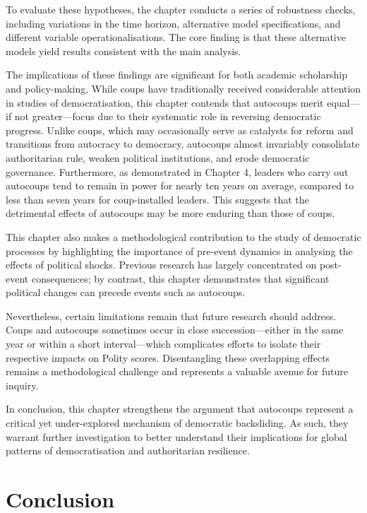 \documentclass[
  12pt,
]{report}
\begin{document}
To evaluate these hypotheses, the chapter conducts a series of
robustness checks, including variations in the time horizon, alternative
model specifications, and different variable operationalisations. The
core finding is that these alternative models yield results consistent
with the main analysis.

The implications of these findings are significant for both academic
scholarship and policy-making. While coups have traditionally received
considerable attention in studies of democratisation, this chapter
contends that autocoups merit equal---if not greater---focus due to
their systematic role in reversing democratic progress. Unlike coups,
which may occasionally serve as catalysts for reform and transitions
from autocracy to democracy, autocoups almost invariably consolidate
authoritarian rule, weaken political institutions, and erode democratic
governance. Furthermore, as demonstrated in Chapter 4, leaders who carry
out autocoups tend to remain in power for nearly ten years on average,
compared to less than seven years for coup-installed leaders. This
suggests that the detrimental effects of autocoups may be more enduring
than those of coups.

This chapter also makes a methodological contribution to the study of
democratic processes by highlighting the importance of pre-event
dynamics in analysing the effects of political shocks. Previous research
has largely concentrated on post-event consequences; by contrast, this
chapter demonstrates that significant political changes can precede
events such as autocoups.

Nevertheless, certain limitations remain that future research should
address. Coups and autocoups sometimes occur in close
succession---either in the same year or within a short interval---which
complicates efforts to isolate their respective impacts on Polity
scores. Disentangling these overlapping effects remains a methodological
challenge and represents a valuable avenue for future inquiry.

In conclusion, this chapter strengthens the argument that autocoups
represent a critical yet under-explored mechanism of democratic
backsliding. As such, they warrant further investigation to better
understand their implications for global patterns of democratisation and
authoritarian resilience.

\chapter{Conclusion}\label{conclusion}
\end{document}
